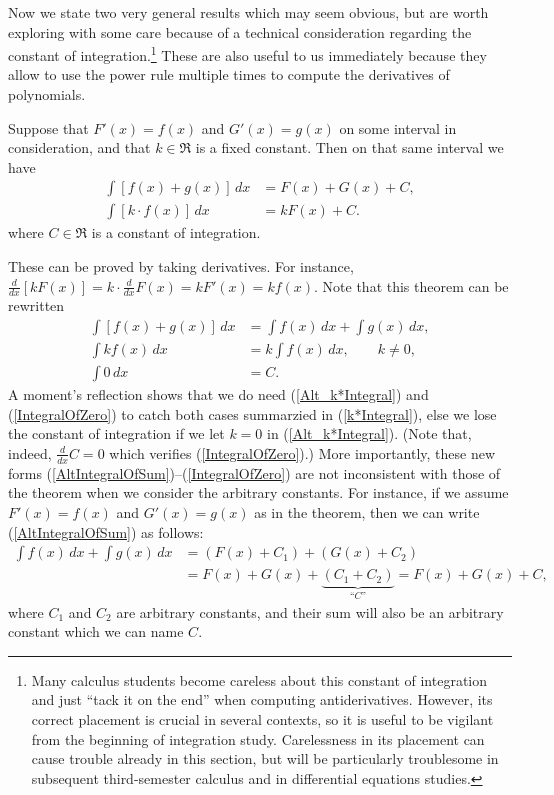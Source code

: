 Now we state two very general results which may seem obvious,
but are worth exploring with some care because of a technical
consideration regarding the constant of integration.\footnote{%
Many calculus students become careless about this constant of integration
and just ``tack it on the end'' when computing antiderivatives.
However, its correct placement is crucial
in several contexts, so it is useful to be vigilant from the beginning
of integration study.  Carelessness
in its placement can cause trouble already in this section,
but will be particularly troublesome in subsequent third-semester
calculus and in differential equations studies.} %
These are also useful to us immediately because they allow to 
use the power rule multiple times to compute the derivatives of
polynomials.
\begin{theorem}
Suppose that $F'(x)=f(x)$ and $G'(x)=g(x)$ on some interval in 
consideration, and that $k\in\Re$ is a fixed constant.  Then
 on that same interval we have
\begin{align}
\int\left[f(x)+g(x)\right]\,dx&=F(x)+G(x)+C,\label{IntegralOfASum}\\
\int\left[k\cdot f(x)\right]\,dx&=kF(x)+C.\label{k*Integral}\end{align}
where $C\in\Re$ is a constant of integration.
\end{theorem}
These can be proved by taking derivatives.
For instance, $\frac{d}{dx}[kF(x)]=k\cdot\frac{d}{dx}F(x)=kF'(x)=kf(x)$.
 Note that this theorem can  be rewritten
\begin{align}
\int\left[f(x)+g(x)\right]\,dx&=\int f(x)\,dx+\int g(x)\,dx,
   \label{AltIntegralOfSum}\\
\int kf(x)\,dx&=k\int f(x)\,dx,\qquad k\ne 0,\label{Alt_k*Integral}\\
\int 0\,dx&=C.\label{IntegralOfZero}\end{align}
A moment's reflection shows that  we do need (\ref{Alt_k*Integral})
and (\ref{IntegralOfZero}) to catch both cases summarzied in
(\ref{k*Integral}), else we lose the constant of integration if
we let $k=0$ in (\ref{Alt_k*Integral}).  
(Note that, indeed, $\frac{d}{dx}C=0$ which
verifies (\ref{IntegralOfZero}).)  More importantly, these new
forms (\ref{AltIntegralOfSum})--(\ref{IntegralOfZero})
are not inconsistent with those of the theorem when
we consider the arbitrary constants.  For instance,
if we assume $F'(x)=f(x)$ and $G'(x)=g(x)$ as in the theorem,
then we can write (\ref{AltIntegralOfSum}) as follows:
\begin{align*}\int f(x)\,dx+\int g(x)\,dx
&=\left(F(x)+C_1\right)+\left(G(x)+C_2\right)\\
&=F(x)+G(x)+\underbrace{\left(C_1+C_2\right)}_{\text{``$C$''}}
=F(x)+G(x)+C,\end{align*} 
where $C_1$ and $C_2$ are arbitrary constants, and their sum
will also be an arbitrary constant which we can name $C$.

